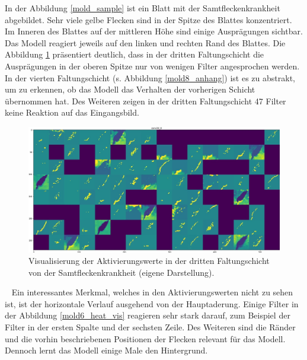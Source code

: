 In der Abbildung \ref{mold_sample} ist ein Blatt mit der Samtfleckenkrankheit abgebildet. Sehr viele gelbe Flecken sind in der Spitze des Blattes konzentriert. Im Inneren des Blattes auf der mittleren Höhe sind einige Ausprägungen sichtbar. Das Modell reagiert jeweils auf den linken und rechten Rand des Blattes. Die Abbildung \ref{mold6_act_vis} präsentiert deutlich, dass in der dritten Faltungschicht die Ausprägungen in der oberen Spitze nur von wenigen Filter angesprochen werden. In der vierten Faltungschicht (s. Abbildung \ref{mold8_anhang}) ist es zu abstrakt, um zu erkennen, ob das Modell das Verhalten der vorherigen Schicht übernommen hat. Des Weiteren zeigen in der dritten Faltungschicht 47 Filter keine Reaktion auf das Eingangsbild.

\begin{figure}[h!]
	\centering
	\includegraphics[width=\textwidth]{visualisierungen/leaf_mold/activation/mold6.JPG}
	\caption{Visualisierung der Aktivierungswerte in der dritten Faltungschicht von der Samtfleckenkrankheit (eigene Darstellung).}
	\label{mold6_act_vis}
\end{figure}
~\newline
Ein interessantes Merkmal, welches in den Aktivierungswerten nicht zu sehen ist, ist der horizontale Verlauf ausgehend von der Hauptaderung. Einige Filter in der Abbildung \ref{mold6_heat_vis} reagieren sehr stark darauf, zum Beispiel der Filter in der ersten Spalte und der sechsten Zeile. Des Weiteren sind die Ränder und die vorhin beschriebenen Positionen der Flecken relevant für das Modell. Dennoch lernt das Modell einige Male den Hintergrund.

